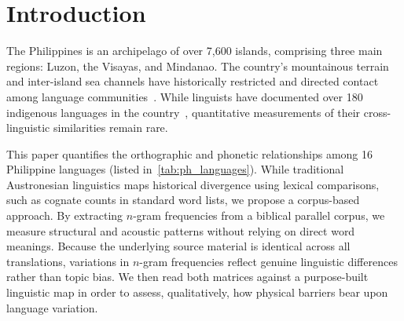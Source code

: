 \section{Introduction}\label{sec:intro}

The Philippines is an archipelago of over 7,600 islands, comprising three main
regions: Luzon, the Visayas, and Mindanao. The country's mountainous terrain
and inter-island sea channels have historically restricted and directed contact
among language communities~\cite{Boquet_2017}. While linguists have documented
over 180 indigenous languages in the country~\cite{ethnologue2025},
quantitative measurements of their cross-linguistic similarities remain rare.

This paper quantifies the orthographic and phonetic relationships among 16
Philippine languages (listed in~\cref{tab:ph_languages}). While traditional
Austronesian linguistics maps historical divergence using lexical comparisons,
such as cognate counts in standard word lists, we propose a corpus-based
approach. By extracting $n$-gram frequencies from a biblical parallel corpus,
we measure structural and acoustic patterns without relying on direct word
meanings. Because the underlying source material is identical across all
translations, variations in $n$-gram frequencies reflect genuine linguistic
differences rather than topic bias. We then read both matrices against a
purpose-built linguistic map in order to assess, qualitatively, how physical
barriers bear upon language variation.

